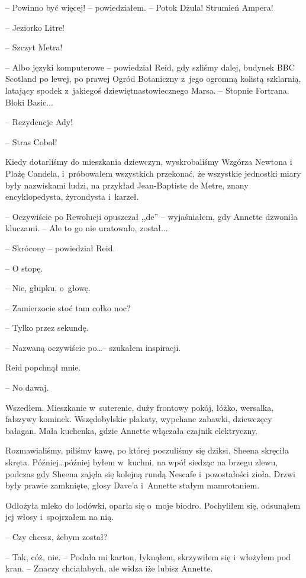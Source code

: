 \documentclass[oneside,polish,11pt,sfheadings]{mwbk}
\begin{document}
-- Powinno być więcej! -- powiedziałem. -- Potok Dżula! Strumień Ampera!

-- Jeziorko Litre!

-- Szczyt Metra!

-- Albo języki komputerowe -- powiedział Reid, gdy szliśmy dalej, budynek
BBC Scotland po lewej, po prawej Ogród Botaniczny z~jego ogromną kolistą
szklarnią, latający spodek z~jakiegoś dziewiętnastowiecznego Marsa. -- Stopnie Fortrana. Bloki Basic...

-- Rezydencje Ady!

-- Stras Cobol!

Kiedy dotarliśmy do mieszkania dziewczyn, wyskrobaliśmy Wzgórza Newtona
i Plażę Candela, i~próbowałem wszystkich przekonać, że wszystkie
jednostki miary były nazwiskami ludzi, na przykład Jean-Baptiste de
Metre, znany encyklopedysta, żyrondysta i~karzeł.

-- Oczywiście po Rewolucji opuszczał ,,de'' -- wyjaśniałem, gdy Annette
dzwoniła kluczami. -- Ale to go nie uratowało, został...

-- Skrócony -- powiedział Reid.

-- O stopę.

-- Nie, głupku, o~głowę.

-- Zamierzocie stoć tam cołko noc?

-- Tylko przez sekundę.

-- Nazwaną oczywiście po\ldots -- szukałem inspiracji.

Reid popchnął mnie. 

-- No dawaj.

Wszedłem. Mieszkanie w~suterenie, duży frontowy pokój, łóżko, wersalka,
fałszywy kominek. Wszędobylskie plakaty, wypchane zabawki, dziewczęcy
bałagan. Mała kuchenka, gdzie Annette włączała czajnik elektryczny.

Rozmawialiśmy, piliśmy kawę, po której poczuliśmy się dziksi, Sheena
skręciła skręta. Później\ldots później byłem w~kuchni, na wpół siedząc na
brzegu zlewu, podczas gdy Sheena zajęła się kolejną rundą Nescafe i~pozostałości zioła. Drzwi były prawie zamknięte, głosy Dave'a i~Annette
stałym mamrotaniem.

Odłożyła mleko do lodówki, oparła się o~moje biodro. Pochyliłem się,
odsunąłem jej włosy i~spojrzałem na nią.

-- Czy chcesz, żebym został?

-- Tak, cóż, nie. -- Podała mi karton, łyknąłem, skrzywiłem się i~włożyłem pod kran. -- Znaczy chciałabych, ale widza iże lubisz Annette.
\end{document}
